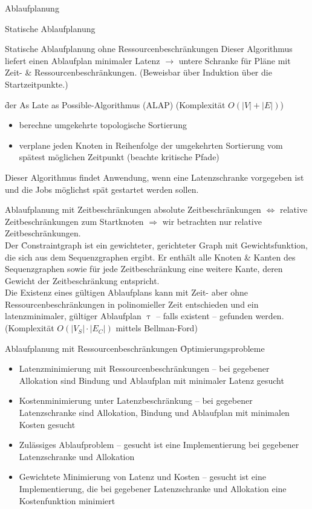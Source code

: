 \begin{chapter}{Ablaufplanung}
\begin{section}{Statische Ablaufplanung}
\begin{subsection}{Statische Ablaufplanung ohne Ressourcenbeschränkungen}
   Dieser Algorithmus liefert einen Ablaufplan minimaler Latenz $\rightarrow$ untere Schranke für Pläne mit Zeit- \& Ressourcenbeschränkungen. (Beweisbar über Induktion über die Startzeitpunkte.) 
   
   \f{der As Late as Possible-Algorithmus (ALAP) (Komplexität $O(|V| + |E|)$)}
   \begin{itemize}
    \item berechne umgekehrte topologische Sortierung
    \item verplane jeden Knoten in Reihenfolge der umgekehrten Sortierung vom spätest möglichen Zeitpunkt (beachte kritische Pfade)
   \end{itemize}

   Dieser Algorithmus findet Anwendung, wenn eine Latenzschranke vorgegeben ist und die Jobs möglichst spät gestartet werden sollen.
   \end{subsection}
   
   \begin{subsection}{Ablaufplanung mit Zeitbeschränkungen}
    absolute Zeitbeschränkungen $\Leftrightarrow$ relative Zeitbeschränkungen zum Startknoten $\Rightarrow$ wir betrachten nur relative Zeitbeschränkungen.\\
    
    Der \f{Constraintgraph} ist ein gewichteter, gerichteter Graph mit Gewichtsfunktion, die sich aus dem Sequenzgraphen ergibt. Er enthält alle Knoten \& Kanten des Sequenzgraphen sowie für jede Zeitbeschränkung eine weitere Kante, deren Gewicht der Zeitbeschränkung entspricht.\\
    
    Die Existenz eines gültigen Ablaufplans kann mit Zeit- aber ohne Ressourcenbeschränkungen in polinomieller Zeit entschieden und ein latenzminimaler, gültiger Ablaufplan $\uptau$ -- falls existent -- gefunden werden. (Komplexität $O(|V_S|\cdot|E_C|)$ mittels Bellman-Ford)\\
   \end{subsection}
   
   \begin{subsection}{Ablaufplanung mit Ressourcenbeschränkungen}
    \f{Optimierungsprobleme}
    \begin{itemize}
     \item Latenzminimierung mit Ressourcenbeschränkungen -- bei gegebener Allokation sind Bindung und Ablaufplan mit minimaler Latenz gesucht
     \item Kostenminimierung unter Latenzbeschränkung -- bei gegebener Latenzschranke sind Allokation, Bindung und Ablaufplan mit minimalen Kosten gesucht
     \item Zulässiges Ablaufproblem -- gesucht ist eine Implementierung bei gegebener Latenzschranke und Allokation
     \item Gewichtete Minimierung von Latenz und Kosten -- gesucht ist eine Implementierung, die bei gegebener Latenzschranke und Allokation eine Kostenfunktion minimiert
    \end{itemize}
    

\end{subsection}
\end{section}
\end{chapter}
